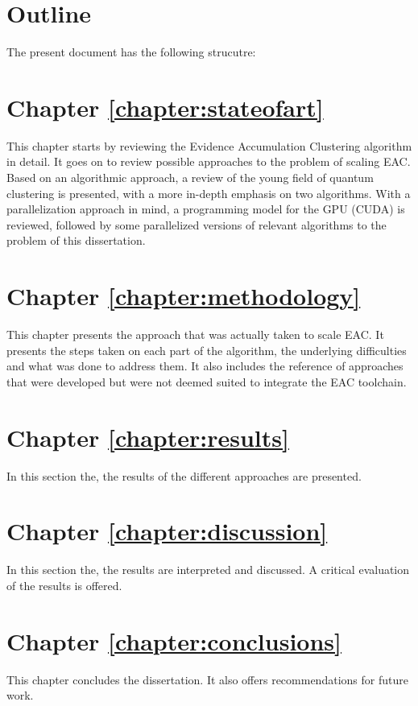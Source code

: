 \section{Outline}

The present document has the following strucutre:

\section*{Chapter \ref{chapter:stateofart}}

This chapter starts by reviewing the Evidence Accumulation Clustering algorithm in detail.
It goes on to review possible approaches to the problem of scaling EAC.
Based on an algorithmic approach, a review of the young field of quantum clustering is presented, with a more in-depth emphasis on two algorithms.
With a parallelization approach in mind, a programming model for the GPU (CUDA) is reviewed, followed by some parallelized versions of relevant algorithms to the problem of this dissertation.

\section*{Chapter \ref{chapter:methodology}}

This chapter presents the approach that was actually taken to scale EAC.
It presents the steps taken on each part of the algorithm, the underlying difficulties and what was done to address them.
It also includes the reference of approaches that were developed but were not deemed suited to integrate the EAC toolchain.

\section*{Chapter \ref{chapter:results}}

In this section the, the results of the different approaches are presented.

\section*{Chapter \ref{chapter:discussion}}

In this section the, the results are interpreted and discussed.
A critical evaluation of the results is offered.

\section*{Chapter \ref{chapter:conclusions}}

This chapter concludes the dissertation.
It also offers recommendations for future work.